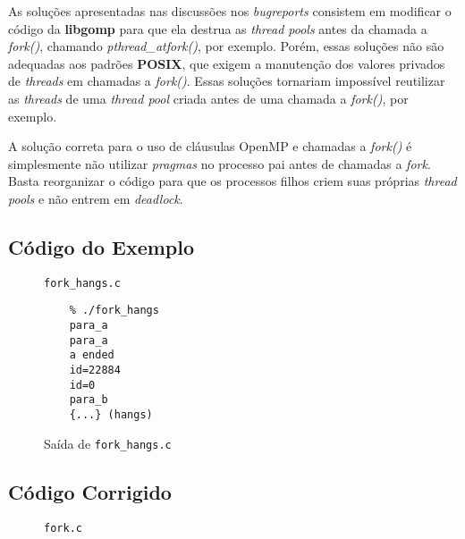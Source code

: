 \documentclass[a4paper, 12pt]{article}
\begin{document}
As soluções apresentadas nas discussões nos \textit{bugreports} consistem
em modificar o código da \textbf{libgomp} para que ela destrua as
\textit{thread pools} antes da chamada a \textit{fork()}, chamando
\textit{pthread\_atfork()}, por exemplo. Porém, essas soluções não são
adequadas aos padrões \textbf{POSIX}, que exigem a manutenção dos valores
privados de \textit{threads} em chamadas a \textit{fork()}. Essas soluções
tornariam impossível reutilizar as \textit{threads} de uma \textit{thread pool}
criada antes de uma chamada a \textit{fork()}, por exemplo.

A solução correta para o uso de cláusulas OpenMP e chamadas a \textit{fork()}
é simplesmente não utilizar \textit{pragmas} no processo pai antes de
chamadas a \textit{fork}. Basta reorganizar o código para que os processos
filhos criem suas próprias \textit{thread pools} e não entrem em 
\textit{deadlock}.

\subsection{Código do Exemplo}\label{sec:example}
\begin{figure}[H]
    \centering
    
    \caption{\texttt{fork\_hangs.c}}
    \label{fig:fork_hangs}
\end{figure}

\begin{figure}[H]
    \centering
    \begin{lstlisting}
    % ./fork_hangs
    para_a
    para_a
    a ended
    id=22884
    id=0
    para_b
    {...} (hangs)
    \end{lstlisting}
    \caption{Saída de \texttt{fork\_hangs.c}}
    \label{fig:fork_hangs_out}
\end{figure}

\subsection{Código Corrigido}\label{sec:fixed}
\begin{figure}[H]
    \centering
    
    \caption{\texttt{fork.c}}
    \label{fig:fork}
\end{figure}
\end{document}
